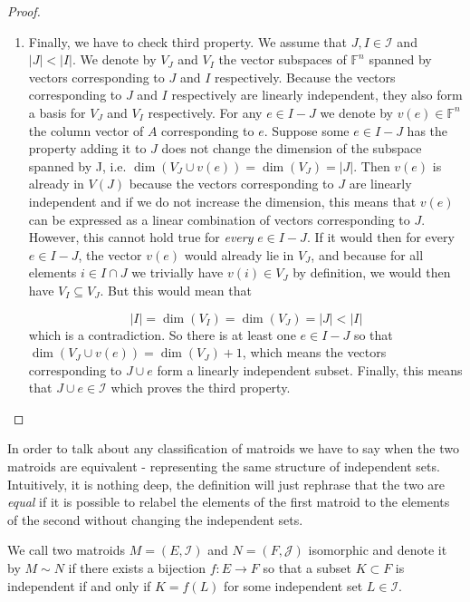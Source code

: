\begin{proof}
\begin{enumerate}
    \item Finally, we have to check third property. We assume that $J, I \in \mathcal{I}$ and $|J| < |I|$. We denote by $V_J$ and $V_I$ the vector subspaces of $\mathbb{F}^n$ spanned by vectors corresponding to $J$ and $I$ respectively. Because the vectors corresponding to $J$ and $I$ respectively are linearly independent, they also form a basis for $V_J$ and $V_I$ respectively. For any $e \in I - J$ we denote by $v(e) \in \mathbb{F}^n$ the column vector of $A$ corresponding to $e$. Suppose some $e \in I - J$ has the property adding it to $J$ does not change the dimension of the subspace spanned by J, i.e. $\dim (V_J \cup v(e)) = \dim (V_J) = |J|$. Then $v(e)$ is already in $V(J)$ because the vectors corresponding to $J$ are linearly independent and if we do not increase the dimension, this means that $v(e)$ can be expressed as a linear combination of vectors corresponding to $J$. However, this cannot hold true for \textit{every} $e \in I - J$. If it would then for every $e \in I - J$, the vector $v(e) $ would already lie in $ V_J$, and because for all elements $i \in I \cap J$ we trivially have $v(i) \in V_J$ by definition, we would then have $V_I \subseteq V_J$. But this would mean that 

    $$|I| = \dim(V_I) = \dim(V_J) = |J| < |I|$$
     which is a contradiction. So there is at least one $e \in I - J$ so that $\dim(V_J \cup v(e)) = \dim(V_J) + 1$, which means the vectors corresponding to $J \cup e$ form a linearly independent subset. Finally, this means that $J \cup e \in \mathcal{I}$ which proves the third property.

\end{enumerate}
\end{proof}

In order to talk about any classification of matroids we have to say when the two matroids are equivalent - representing the same structure of independent sets. Intuitively, it is nothing deep, the definition will just rephrase that the two are \textit{equal} if it is possible to relabel the elements of the first matroid to the elements of the second without changing the independent sets.

\begin{defn}
    We call two matroids $M = (E, \mathcal{I})$ and $N = (F, \mathcal{J})$ isomorphic and denote it by $M \sim N$ if there exists a bijection $f: E \to F$ so that a subset $K \subset F$ is independent if and only if $K = f(L)$ for some independent set $L \in \mathcal{I}$.
\end{defn}


